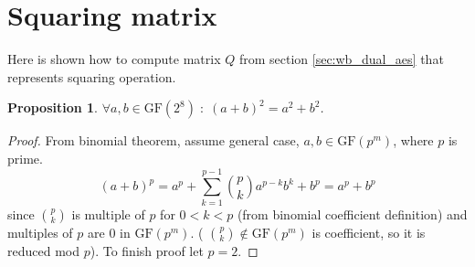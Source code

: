 \documentclass[11pt,oneside,final]{fithesis2}
\newtheorem{myprop}{Proposition}
\newcommand{\gfe}{\ensuremath{\text{GF}\left(2^8\right)}}
\begin{document}
    \section{Squaring matrix}\label{appendix:sqr_matrix}
    Here is shown how to compute matrix $Q$ from section \ref{sec:wb_dual_aes} that represents squaring operation.
    
    \begin{myprop}\label{prop:squaring_is_linear}
     $\forall a,b \in \gfe \; : \; \left(a + b\right)^2 = a^2 + b^2$. 
    \end{myprop}
    \begin{proof}
    From binomial theorem, assume general case, $a,b \in \text{GF}(p^m)$, where $p$ is prime.
    \begin{equation*}
     (a+b)^p = a^p + \sum_{k=1}^{p-1} \binom{p}{k} a^{p-k}b^{k} + b^p = a^p + b^p
    \end{equation*}
    since $\binom{p}{k}$ is multiple of $p$ for $0 < k < p$ (from binomial coefficient definition) and multiples of $p$ are $0$ in $\text{GF}(p^m)$. (
    $\binom{p}{k} \notin \text{GF}(p^m)$ is coefficient, so it is reduced mod $p$). To finish proof let $p=2$.
    \end{proof}
\end{document}
